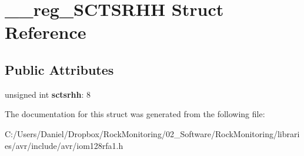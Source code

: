 \hypertarget{struct____reg___s_c_t_s_r_h_h}{}\section{\+\_\+\+\_\+reg\+\_\+\+S\+C\+T\+S\+R\+HH Struct Reference}
\label{struct____reg___s_c_t_s_r_h_h}
\subsection*{Public Attributes}
\begin{DoxyCompactItemize}
\item 
unsigned int {\bfseries sctsrhh}\+: 8\hypertarget{struct____reg___s_c_t_s_r_h_h_abf6b2602dac4418c5948d85c2d8f14fc}{}\label{struct____reg___s_c_t_s_r_h_h_abf6b2602dac4418c5948d85c2d8f14fc}

\end{DoxyCompactItemize}


The documentation for this struct was generated from the following file\+:\begin{DoxyCompactItemize}
\item 
C\+:/\+Users/\+Daniel/\+Dropbox/\+Rock\+Monitoring/02\+\_\+\+Software/\+Rock\+Monitoring/libraries/avr/include/avr/iom128rfa1.\+h\end{DoxyCompactItemize}
